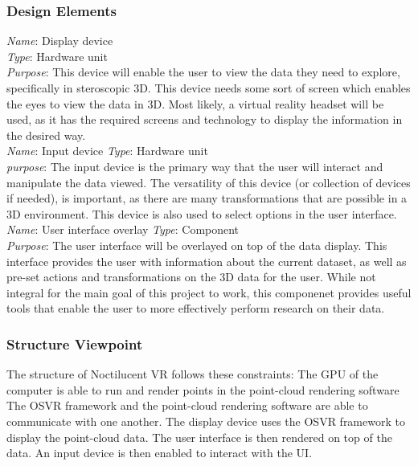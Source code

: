 \subsubsection{Design Elements}

        \textit{Name}: Display device\\
        \textit{Type}: Hardware unit\\
        \textit{Purpose}: This device will enable the user to view the data they need to explore, specifically in steroscopic 3D. 
        This device needs some sort of screen which enables the eyes to view the data in 3D. Most likely, a virtual reality headset
        will be used, as it has the required screens and technology to display the information in the desired way.\\
\newline
        \textit{Name}: Input device
        \textit{Type}: Hardware unit\\
        \textit{purpose}: The input device is the primary way that the user will interact and manipulate the data viewed. 
        The versatility of this device (or collection of devices if needed), is important, as there are many transformations
        that are possible in a 3D environment. This device is also used to select options in the user interface.\\
\newline
        \textit{Name}: User interface overlay
        \textit{Type}: Component\\
        \textit{Purpose}: The user interface will be overlayed on top of the data display. This interface provides
        the user with information about the current dataset, as well as pre-set actions and transformations on the 
        3D data for the user. While not integral for the main goal of this project to work, this componenet provides
        useful tools that enable the user to more effectively perform research on their data.

\subsubsection{Structure Viewpoint}

The structure of Noctilucent VR follows these constraints:
The GPU of the computer is able to run and render points in the point-cloud rendering software
The OSVR framework and the point-cloud rendering software are able to communicate with one another.
The display device uses the OSVR framework to display the point-cloud data.
The user interface is then rendered on top of the data.
An input device is then enabled to interact with the UI.

